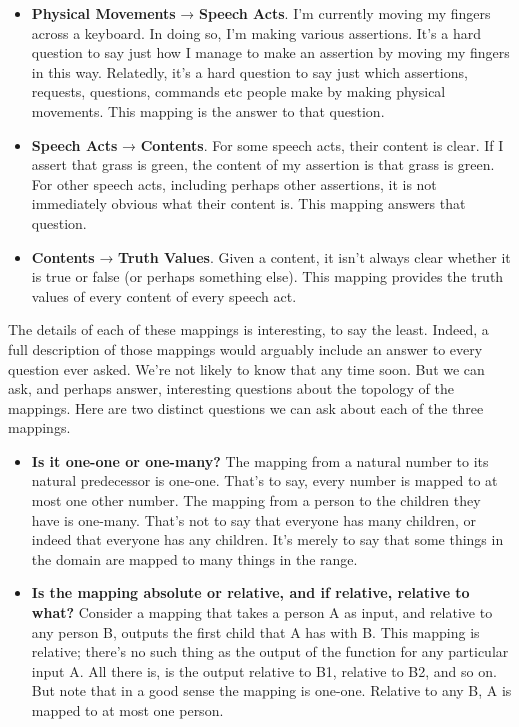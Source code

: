 \documentclass[
  10pt,
  letterpaper,
  DIV=11,
  numbers=noendperiod,
  twoside]{scrartcl}
\begin{document}
\begin{itemize}
\item
  \textbf{Physical Movements} → \textbf{Speech Acts}. I'm currently
  moving my fingers across a keyboard. In doing so, I'm making various
  assertions. It's a hard question to say just how I manage to make an
  assertion by moving my fingers in this way. Relatedly, it's a hard
  question to say just which assertions, requests, questions, commands
  etc people make by making physical movements. This mapping is the
  answer to that question.
\item
  \textbf{Speech Acts} → \textbf{Contents}. For some speech acts, their
  content is clear. If I assert that grass is green, the content of my
  assertion is that grass is green. For other speech acts, including
  perhaps other assertions, it is not immediately obvious what their
  content is. This mapping answers that question.
\item
  \textbf{Contents} → \textbf{Truth Values}. Given a content, it isn't
  always clear whether it is true or false (or perhaps something else).
  This mapping provides the truth values of every content of every
  speech act.
\end{itemize}

The details of each of these mappings is interesting, to say the least.
Indeed, a full description of those mappings would arguably include an
answer to every question ever asked. We're not likely to know that any
time soon. But we can ask, and perhaps answer, interesting questions
about the topology of the mappings. Here are two distinct questions we
can ask about each of the three mappings.

\begin{itemize}
\item
  \textbf{Is it one-one or one-many?} The mapping from a natural number
  to its natural predecessor is one-one. That's to say, every number is
  mapped to at most one other number. The mapping from a person to the
  children they have is one-many. That's not to say that everyone has
  many children, or indeed that everyone has any children. It's merely
  to say that some things in the domain are mapped to many things in the
  range.
\item
  \textbf{Is the mapping absolute or relative, and if relative, relative
  to what?} Consider a mapping that takes a person A as input, and
  relative to any person B, outputs the first child that A has with B.
  This mapping is relative; there's no such thing as the output of the
  function for any particular input A. All there is, is the output
  relative to B1, relative to B2, and so on. But note that in a good
  sense the mapping is one-one. Relative to any B, A is mapped to at
  most one person.
\end{itemize}
\end{document}

